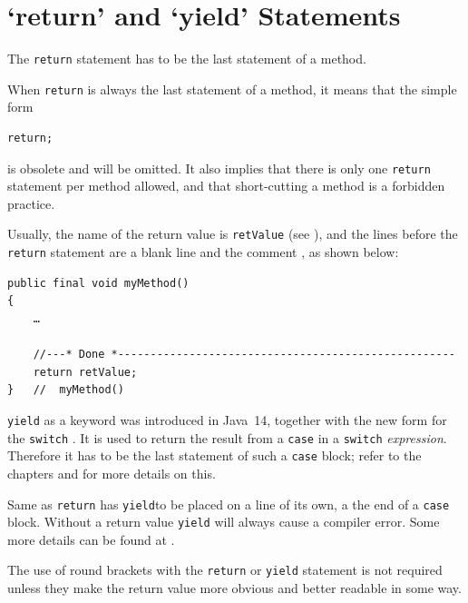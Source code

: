 \section{‘return’ and ‘yield’ Statements}
The \lstinline|return| statement has to be the last statement of a method.

When \lstinline|return| is always the last statement of a method, it means that the simple form
\begin{lstlisting}
return;
\end{lstlisting}
is obsolete and will be omitted. It also implies that there is only one \lstinline|return| statement per method allowed, and that short-cutting a method is a forbidden practice.

Usually, the name of the return value is \lstinline|retValue| (see ), and the lines before the \lstinline|return| statement are a blank line and the comment , as shown below:
\begin{lstlisting}
public final void myMethod()
{
    …
        
    //---* Done *----------------------------------------------------
    return retValue;
}   //  myMethod()
\end{lstlisting}

\lstinline|yield| as a keyword was introduced in Java~14, together with the new form for the \lstinline|switch| \autocite{JEP325,JEP354,JEP361}. It is used to return the result from a \lstinline|case| in a \lstinline|switch| \textit{expression}. Therefore it has to be the last statement of such a \lstinline|case| block; refer to the chapters  and  for more details on this.

Same as \lstinline|return| has \lstinline|yield|to be placed on a line of its own, a the end of a \lstinline|case| block. Without  a return value \lstinline|yield| will always cause a compiler error. Some more details can be found at \autocite{ORACLE_DOC_LANGUAGE_SPECIFICATION:Yield}.

The use of round brackets with the \lstinline|return| or \lstinline|yield| statement is not required unless they make the return value more obvious and better readable in some way.

